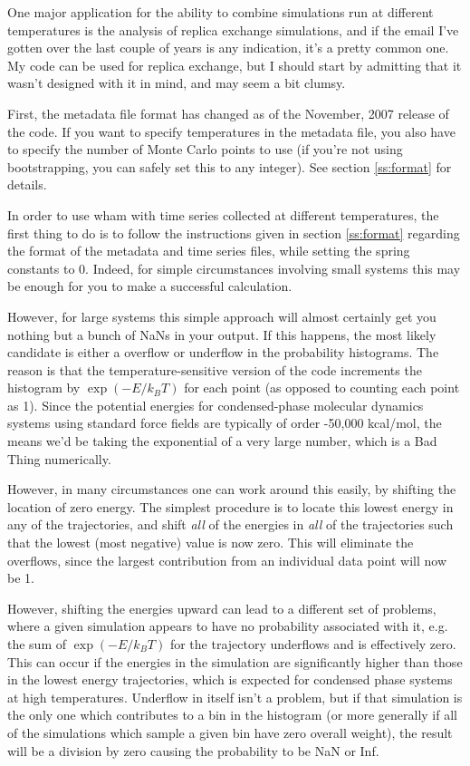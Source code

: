 \documentclass[12pt]{article}
\begin{document}
One major application for the ability to combine simulations run at different
temperatures is the analysis of replica exchange simulations, and if the
email I've gotten over the last couple of years is any indication, it's a
pretty common one.  My code can be used for replica exchange, but I should
start by admitting that it wasn't designed with it in mind, and may seem a
bit clumsy.  

First, the metadata file format has changed as of the November, 2007 release
of the code.  If you want to specify temperatures in the metadata file, you
also have to specify the number of Monte Carlo points to use (if you're not
using bootstrapping, you can safely set this to any integer).  See section
\ref{ss:format} for details.

In order to use wham with time series collected at different temperatures,
the first thing to do is to follow the instructions given in section
\ref{ss:format} regarding the format of the metadata and time series files,
while setting the spring constants to 0.  Indeed, for simple circumstances
involving small systems this may be enough for you to make a successful
calculation.  

However, for large systems this simple approach will almost certainly get you
nothing but a bunch of NaNs in your output.  If this happens, the most likely
candidate is either a overflow or underflow in the probability histograms.
The reason is that the temperature-sensitive version of the code increments
the histogram by $\exp(-E/k_B T)$ for each point (as opposed to counting each
point as 1).  Since the potential energies for condensed-phase
molecular dynamics systems using standard force fields are typically of order
-50,000 kcal/mol, the means we'd be taking the exponential of a very large
number, which is a Bad Thing numerically.  

However, in many circumstances one can work around this easily, by shifting
the location of zero energy.  The simplest procedure is to locate this lowest
energy in any of the trajectories, and shift \emph{all} of the energies in
\emph{all} of the trajectories such that the lowest (most negative) value is
now zero.  This will eliminate the overflows, since the largest contribution
from an individual data point will now be 1.  

However, shifting the energies upward can lead to a different set of
problems, where a given simulation appears to have no probability associated
with it, e.g. the sum of $\exp(-E/k_B T)$ for the trajectory underflows and
is effectively zero.  This can occur if the energies in the simulation are
significantly higher than those in the lowest energy trajectories, which is
expected for condensed phase systems at high temperatures. Underflow in
itself isn't a problem, but if that simulation is the only one which
contributes to a bin in the histogram (or more generally if all of the
simulations which sample a given bin have zero overall weight), the result
will be a division by zero causing the probability to be NaN or Inf.  
\end{document}
